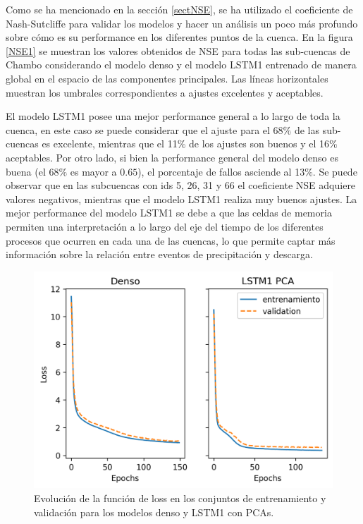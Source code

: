 Como se ha mencionado en la sección \ref{sectNSE}, se ha utilizado el coeficiente de Nash-Sutcliffe para
validar los modelos y hacer un análisis un poco más profundo sobre cómo es su performance en los diferentes puntos
de la cuenca. En la figura \ref{NSE1} se muestran los valores obtenidos 
de NSE para todas las sub-cuencas de Chambo considerando el modelo denso y el modelo LSTM1 entrenado de manera global 
en el espacio de las componentes principales. Las líneas horizontales muestran los umbrales correspondientes a 
ajustes excelentes y aceptables. 

El modelo LSTM1 posee una mejor performance general a lo largo de toda la cuenca, 
en este caso se  puede considerar que el ajuste para el 68$\%$ de las sub-cuencas es excelente, 
mientras que el 11$\%$ de los ajustes son buenos y el 16$\%$  aceptables. 
Por otro lado, si bien la performance general del modelo denso es buena (el 68$\%$ es mayor a $0.65$), 
el porcentaje de fallos asciende al 13$\%$. Se puede observar que en las subcuencas con ids 5, 26, 31 y 66 el coeficiente NSE adquiere 
valores negativos, mientras que el modelo LSTM1 realiza muy buenos ajustes.
La mejor performance del modelo LSTM1 se debe a que las celdas de memoria permiten una interpretación a lo largo del eje del tiempo de 
los diferentes procesos que ocurren en cada una de las cuencas, lo que permite captar más información sobre la relación entre
eventos de precipitación y descarga. 


\begin{figure}[h!]
  \begin{center}
    \includegraphics[height=3.in]{Figures/loss/comp_loss.png}
    \caption{ Evolución de la función de loss en los conjuntos de entrenamiento y validación para los modelos denso y
    LSTM1 con PCAs.}
    \label{losscomp}
  \end{center}
\end{figure}

